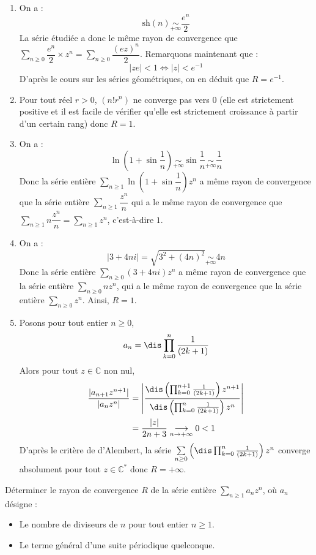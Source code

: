 \documentclass[a4paper,10pt]{report}
\newcommand{\Sum}[2]{\ensuremath{\textstyle{\sum\limits_{#1}^{#2}}}}
\begin{document}
\begin{enumerate}
\item  On a :
$$\textrm{sh}(n) \underset{+ \infty}{\sim} \dfrac{e^n}{2}$$
La série étudiée a donc le même rayon de convergence que $\Sum{n \geq 0}{}  \dfrac{e^n}{2} \times z^n = \Sum{n \geq 0}{}  \dfrac{(ez)^n}{2}$. Remarquons maintenant que :
$$ \vert ze \vert < 1 \Longleftrightarrow \vert z \vert < e^{-1}$$
D'après le cours sur les séries géométriques, on en déduit que $R=e^{-1}$.
\item Pour tout réel $r>0$, $(n!r^n)$ ne converge pas vers $0$ (elle est strictement positive et il est facile de vérifier qu'elle est strictement croissance à partir d'un certain rang) donc $R=1$.
\item On a :
\[
\ln\left(1+\sin\dfrac{1}{n}\right)\underset{+\infty}{\sim}\sin\dfrac{1}{n}\underset{+\infty}{\sim}\dfrac{1}{n}
\]
Donc la série entière $\Sum{n \geq 1}{}\ln\left(1+\sin\dfrac{1}{n}\right)z^n$ a même rayon de convergence que la série entière $\Sum{n \geq 1}{} \dfrac{z^n}{n}$ qui a le même rayon de convergence que $\Sum{n \geq 1}{} n\dfrac{z^n}{n} = \Sum{n \geq 1}{} z^n$, c'est-à-dire $1$.
\item On a :
\[
\vert 3+4ni\vert=\sqrt{3^2+(4n)^2}\underset{+\infty}{\sim}4n
\]
Donc la série entière $\Sum{n \geq 0}{} (3+4ni)z^n$ a même rayon de convergence que la série entière $\Sum{n \geq 0}{} nz^n$, qui a le même rayon de convergence que la série entière $\Sum{n \geq 0}{} z^n$. Ainsi, $R=1$.
\item Posons pour tout entier $n \geq 0$,
$$a_n = \dis \prod_{k=0}^n\dfrac{1}{(2k+1)} $$
Alors pour tout $z \in \mathbb{C}$ non nul, 
\begin{align*}
\dfrac{\vert a_{n+1} z^{n+1} \vert }{\vert a_n z^n \vert} & =\left\vert\dfrac{\dis \left(\prod_{k=0}^{n+1}\frac{1}{(2k+1)}\right)z^{n+1}}{\dis \left(\prod_{k=0}^n\frac{1}{(2k+1)}\right)z^n}\right\vert \\
& =\dfrac{\vert z\vert }{2n+3}\underset{n \rightarrow +\infty}{\longrightarrow}0<1
\end{align*}
D'après le critère de d'Alembert, la série $\Sum{n \geq 0}{} \left(\dis \prod_{k=0}^n\frac{1}{(2k+1)}\right)z^n$ converge absolument pour tout $z\in\mathbb{C}^*$ donc $R=+\infty$. 
\end{enumerate}

\begin{Exa} Déterminer le rayon de convergence $R$ de la série entière $\Sum{n\geq 1}{} a_n z^n$, où $a_n$ désigne : 
\begin{itemize}
\item Le nombre de diviseurs de $n$ pour tout entier $n\geq 1$.
\item Le terme général d'une suite périodique quelconque. 
\end{itemize}
\end{Exa}
\end{document}
